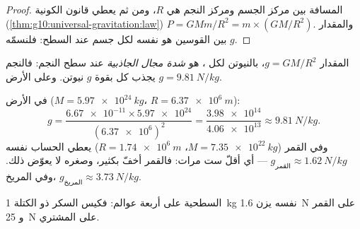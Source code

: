 \begin{proof}
المسافة بين مركز الجسم ومركز النجم هي $R$، ومن ثم يعطي
قانون  الكونية
(\cref{thm:g10:universal-gravitation:law})
$P = G M m / R^2 = m \times \left(G M / R^2\right)$. والمقدار بين القوسين هو
نفسه لكل جسم عند السطح: فلنسمّه $g$.
\end{proof}

\begin{definition}\label{def:g10:universal-gravitation:fieldstrength}
المقدار $g = G M / R^2$، بالنيوتن لكل ، هو
\emph{شدة مجال الجاذبية}
عند سطح النجم: فالنجم يجذب كل  بقوة $g$ نيوتن.
وعلى الأرض $g = \qty{9.81}{N/kg}$.
\end{definition}

\begin{example}[حساب $g$]\label{ex:g10:universal-gravitation:gvalues}
في الأرض ($M = \qty{5.97e24}{kg}$، $R = \qty{6.37e6}{m}$):
\[
g = \frac{\num{6.67e-11} \times \num{5.97e24}}{(\num{6.37e6})^2}
= \frac{\num{3.98e14}}{\num{4.06e13}}
\approx \qty{9.81}{N/kg}.
\]
وفي القمر ($M = \qty{7.35e22}{kg}$، $R = \qty{1.74e6}{m}$) يعطي الحساب
نفسه $g_{\text{القمر}} \approx \qty{1.62}{N/kg}$ --- أي أقلّ ست
مرات: فالقمر أخفّ بكثير، وصغره لا يعوّض
ذلك. وفي المريخ، $g_{\text{المريخ}} \approx \qty{3.73}{N/kg}$.
\end{example}

\begin{omfigure}

{\small {} السطحية على أربعة عوالم: فكيس السكر
ذو الكتلة \qty{1}{kg} نفسه يزن \qty{1.6}{N} على القمر و
\qty{25}{N} على المشتري.}
\end{omfigure}

